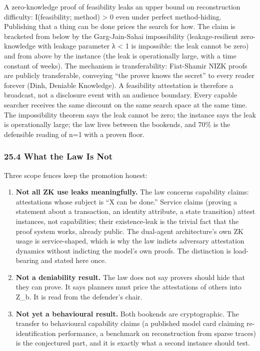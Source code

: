 \documentclass[
  11pt,
]{article}
\providecommand{\tightlist}{%
  \setlength{\itemsep}{0pt}\setlength{\parskip}{0pt}}
\begin{document}
A zero-knowledge proof of feasibility leaks an upper bound on
reconstruction difficulty: I(feasibility; method) \textgreater{} 0 even
under perfect method-hiding. Publishing that a thing can be done prices
the search for how. The claim is bracketed from below by the
Garg-Jain-Sahai impossibility (leakage-resilient zero-knowledge with
leakage parameter λ \textless{} 1 is impossible: the leak cannot be
zero) and from above by the instance (the leak is operationally large,
with a time constant of weeks). The mechanism is transferability:
Fiat-Shamir NIZK proofs are publicly transferable, conveying ``the
prover knows the secret'' to every reader forever (Dinh, Deniable
Knowledge). A feasibility attestation is therefore a broadcast, not a
disclosure event with an audience boundary. Every capable searcher
receives the same discount on the same search space at the same time.
The impossibility theorem says the leak cannot be zero; the instance
says the leak is operationally large; the law lives between the
bookends, and 70\% is the defensible reading of n=1 with a proven floor.

\subsubsection{25.4 What the Law Is Not}\label{what-the-law-is-not}

Three scope fences keep the promotion honest:

\begin{enumerate}
\def\labelenumi{\arabic{enumi}.}
\tightlist
\item
  \textbf{Not all ZK use leaks meaningfully.} The law concerns
  capability claims: attestations whose subject is ``X can be done.''
  Service claims (proving a statement about a transaction, an identity
  attribute, a state transition) attest instances, not capabilities;
  their existence-leak is the trivial fact that the proof system works,
  already public. The dual-agent architecture's own ZK usage is
  service-shaped, which is why the law indicts adversary attestation
  dynamics without indicting the model's own proofs. The distinction is
  load-bearing and stated here once.
\item
  \textbf{Not a deniability result.} The law does not say provers should
  hide that they can prove. It says planners must price the attestations
  of others into Z\_b. It is read from the defender's chair.
\item
  \textbf{Not yet a behavioural result.} Both bookends are
  cryptographic. The transfer to behavioural capability claims (a
  published model card claiming re-identification performance, a
  benchmark on reconstruction from sparse traces) is the conjectured
  part, and it is exactly what a second instance should test.
\end{enumerate}
\end{document}
